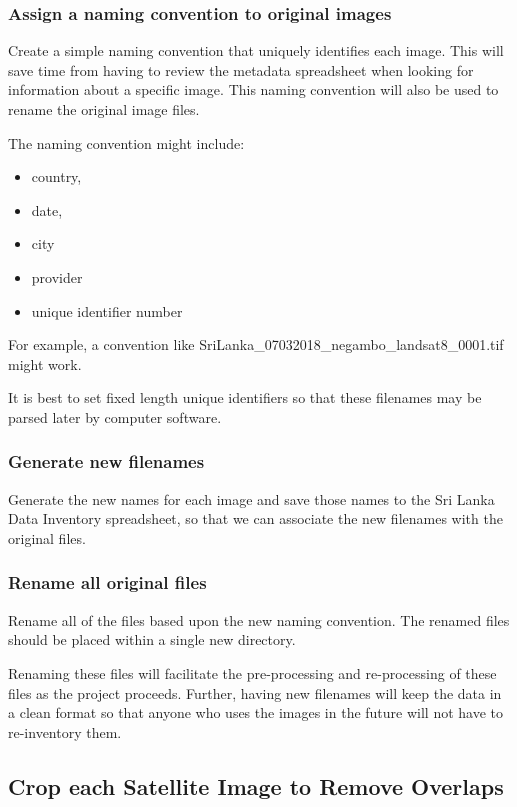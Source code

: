 \documentclass[12pt, a4paper, oneside, headinclude, footinclude]{article}
\begin{document}
\subsubsection{Assign a naming convention to original images}

Create a simple naming convention that uniquely identifies each image. This will
save time from having to review the metadata spreadsheet when looking for
information about a specific image. This naming convention will also be used
to rename the original image files. 

The naming convention might include:
\begin{itemize}
  \item country,
  \item date,
  \item city
  \item provider
  \item unique identifier number
\end{itemize}

For example, a convention like SriLanka\_07032018\_negambo\_landsat8\_0001.tif might work. 

It is best to set fixed length unique identifiers so that these filenames may be parsed later by computer software.


\subsubsection{Generate new filenames}
Generate the new names for each image and save those names to the Sri Lanka Data Inventory spreadsheet, so that we can associate the new filenames with the original files.

\subsubsection{Rename all original files}
Rename all of the files based upon the new naming convention. The renamed files should be placed within a single new directory.

Renaming these files will facilitate the pre-processing and re-processing of these files as the project proceeds. Further, having new filenames will keep the data in a clean format so that anyone who uses the images in the future will not have to re-inventory them.

\subsection{Crop each Satellite Image to Remove Overlaps}
\end{document}
